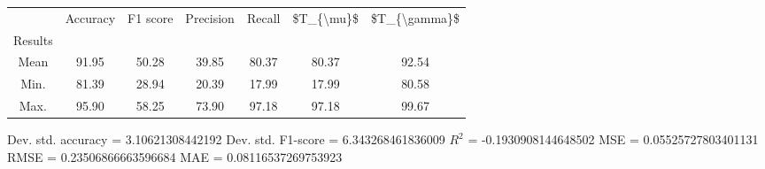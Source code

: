 \begin{tabular}{|c|c|c|c|c|c|c|}
\toprule
{} &  Accuracy &  F1 score &  Precision &  Recall &  \$T\_\{\textbackslash mu\}\$ &  \$T\_\{\textbackslash gamma\}\$ \\
Results &           &           &            &         &            &               \\
\hline
Mean    &     91.95 &     50.28 &      39.85 &   80.37 &      80.37 &         92.54 \\
Min.    &     81.39 &     28.94 &      20.39 &   17.99 &      17.99 &         80.58 \\
Max.    &     95.90 &     58.25 &      73.90 &   97.18 &      97.18 &         99.67 \\
\bottomrule
\end{tabular}

 Dev. std. accuracy = 3.10621308442192
 Dev. std. F1-score = 6.343268461836009
 $R^2$ = -0.1930908144648502
 MSE = 0.05525727803401131
 RMSE = 0.23506866663596684
 MAE = 0.08116537269753923